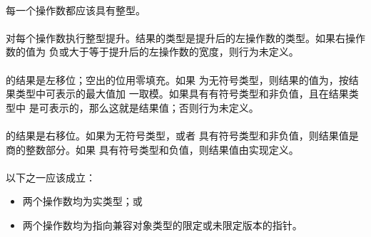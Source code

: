 {\constraint
\paragraph{}
每一个操作数都应该具有整型。

\semantic
\paragraph{}
对每个操作数执行整型提升。结果的类型是提升后的左操作数的类型。如果右操作数的值为
负或大于等于提升后的左操作数的宽度，则行为未定义。

\paragraph{}
的结果是左移位；空出的位用零填充。如果
为无符号类型，则结果的值为，按结果类型中可表示的最大值加
一取模。如果具有有符号类型和非负值，且在结果类型中
是可表示的，那么这就是结果值；否则行为未定义。

\paragraph{}
的结果是右移位。如果为无符号类型，或者
具有符号类型和非负值，则结果值是商的整数部分。如果
具有符号类型和负值，则结果值由实现定义。

\syntax
\paragraph{}

\constraint
\paragraph{}
以下之一应该成立：
\begin{itemize}
  \item{两个操作数均为实类型；或}
  \item{两个操作数均为指向兼容对象类型的限定或未限定版本的指针。}
\end{itemize}

}
